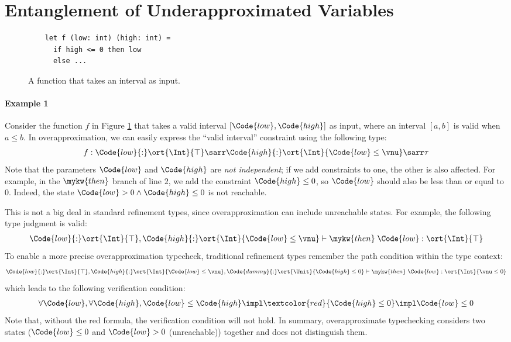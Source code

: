 \section{Entanglement of Underapproximated Variables}

\begin{figure}[h]
    \centering
    \begin{verbatim}
    let f (low: int) (high: int) =
      if high <= 0 then low
      else ...
    \end{verbatim}
    \caption{A function that takes an interval as input.}
    \label{fig:interval-cut}
\end{figure}

\paragraph{Example 1} Consider the function $f$ in Figure \ref{fig:interval-cut} that takes a valid interval $[\Code{low}, \Code{high}]$ as input, where an interval $[a, b]$ is valid when $a \leq b$. In overapproximation, we can easily express the ``valid interval'' constraint using the following type:
\begin{align*}
    f : \Code{low}{:}\ort{\Int}{\top} \sarr \Code{high}{:}\ort{\Int}{\Code{low} \leq \vnu} \sarr \tau
\end{align*}\noindent
Note that the parameters $\Code{low}$ and $\Code{high}$ are \emph{not independent}; if we add constraints to one, the other is also affected. For example, in the $\mykw{then}$ branch of line $2$, we add the constraint $\Code{high} \leq 0$, so $\Code{low}$ should also be less than or equal to $0$. Indeed, the state $\Code{low} > 0 \land \Code{high} \leq 0$ is not reachable.

This is not a big deal in standard refinement types, since overapproximation can include unreachable states. For example, the following type judgment is valid:
\begin{align*}
    \Code{low}{:}\ort{\Int}{\top},  \Code{high}{:}\ort{\Int}{\Code{low} \leq \vnu} \vdash \mykw{then}\; \Code{low} : \ort{\Int}{\top}
\end{align*}\noindent
To enable a more precise overapproximation typecheck, traditional refinement types remember the path condition within the type context:
\begin{align*}
    \Code{low}{:}\ort{\Int}{\top},  \Code{high}{:}\ort{\Int}{\Code{low} \leq \vnu}, \Code{dummy}{:}\ort{\Unit}{\Code{high} \leq 0} \vdash \mykw{then}\; \Code{low} : \ort{\Int}{\vnu \leq 0}
\end{align*}\noindent
which leads to the following verification condition:
\begin{align*}
    \forall \Code{low}, \forall \Code{high}, \Code{low} \leq \Code{high} \impl \textcolor{red}{\Code{high} \leq 0} \impl \Code{low} \leq 0
\end{align*}\noindent
Note that, without the red formula, the verification condition will not hold. In summary, overapproximate typechecking considers two states ($\Code{low} \leq 0$ and $\Code{low} > 0$ (unreachable)) together and does not distinguish them.


